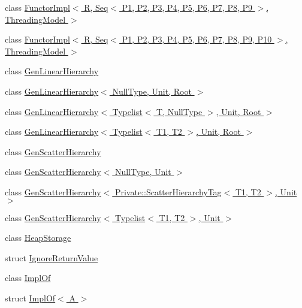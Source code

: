 \begin{DoxyCompactItemize}
class \hyperlink{classLoki_1_1FunctorImpl_3_01R_00_01Seq_3_01P1_00_01P2_00_01P3_00_01P4_00_01P5_00_01P6_00_01P7_0a9743783bda060bdf3a291ac31cfafe2}{Functor\+Impl$<$ R, Seq$<$ P1, P2, P3, P4, P5, P6, P7, P8, P9 $>$,                                                                           Threading\+Model $>$}
\item 
class \hyperlink{classLoki_1_1FunctorImpl_3_01R_00_01Seq_3_01P1_00_01P2_00_01P3_00_01P4_00_01P5_00_01P6_00_01P7_0bc721448b5d6c373b3afd9cd894a0381}{Functor\+Impl$<$ R, Seq$<$ P1, P2, P3, P4, P5, P6, P7, P8, P9, P10 $>$,                                                                           Threading\+Model $>$}
\item 
class \hyperlink{classLoki_1_1GenLinearHierarchy}{Gen\+Linear\+Hierarchy}
\item 
class \hyperlink{classLoki_1_1GenLinearHierarchy_3_01NullType_00_01Unit_00_01Root_01_4}{Gen\+Linear\+Hierarchy$<$ Null\+Type, Unit, Root $>$}
\item 
class \hyperlink{classLoki_1_1GenLinearHierarchy_3_01Typelist_3_01T_00_01NullType_01_4_00_01Unit_00_01Root_01_4}{Gen\+Linear\+Hierarchy$<$ Typelist$<$ T, Null\+Type $>$, Unit, Root $>$}
\item 
class \hyperlink{classLoki_1_1GenLinearHierarchy_3_01Typelist_3_01T1_00_01T2_01_4_00_01Unit_00_01Root_01_4}{Gen\+Linear\+Hierarchy$<$ Typelist$<$ T1, T2 $>$, Unit, Root $>$}
\item 
class \hyperlink{classLoki_1_1GenScatterHierarchy}{Gen\+Scatter\+Hierarchy}
\item 
class \hyperlink{classLoki_1_1GenScatterHierarchy_3_01NullType_00_01Unit_01_4}{Gen\+Scatter\+Hierarchy$<$ Null\+Type, Unit $>$}
\item 
class \hyperlink{classLoki_1_1GenScatterHierarchy_3_01Private_1_1ScatterHierarchyTag_3_01T1_00_01T2_01_4_00_01Unit_01_4}{Gen\+Scatter\+Hierarchy$<$ Private\+::\+Scatter\+Hierarchy\+Tag$<$ T1, T2 $>$, Unit $>$}
\item 
class \hyperlink{classLoki_1_1GenScatterHierarchy_3_01Typelist_3_01T1_00_01T2_01_4_00_01Unit_01_4}{Gen\+Scatter\+Hierarchy$<$ Typelist$<$ T1, T2 $>$, Unit $>$}
\item 
class \hyperlink{classLoki_1_1HeapStorage}{Heap\+Storage}
\item 
struct \hyperlink{structLoki_1_1IgnoreReturnValue}{Ignore\+Return\+Value}
\item 
class \hyperlink{structLoki_1_1ImplOf}{Impl\+Of}
\item 
struct \hyperlink{structLoki_1_1ImplOf_3_01A_01_4}{Impl\+Of$<$ A $>$}

\end{DoxyCompactItemize}
